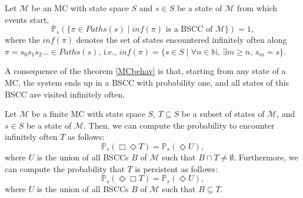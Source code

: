 \begin{theorem}\label{MCbehav}
Let $\mathcal{M}$ be an MC with state space $S$ and $s \in S$
be a state of $\mathcal{M}$ from which events start,
\[
  \mathbb{P}_s(\{\pi \in Paths(s) \; | \; inf(\pi) \text{ is a BSCC of }\mathcal{M}\}) = 1,
\]
where the $inf(\pi)$ denotes the set of states encountered infinitely often along $\pi = s_0 s_1 s_2 \dots \in Paths(s)$, i.e., $inf(\pi) = \{ s \in S \; | \; \forall n \in \mathbb{N},\, \exists m \geq n,\, s_m = s\}$.
\end{theorem}
A consequence of the theorem \ref{MCbehav} is that, starting from any state of a MC, the system ends up in a BSCC with probability one, and all states of this BSCC are visited infinitely often.

\begin{corollary}
  Let $\mathcal{M}$ be a finite MC with state space $S$, $T \subseteq S$ be a subset of states of $\mathcal{M}$, and $s \in S$ be a state of $\mathcal{M}$.
  Then, we can compute the probability to encounter infinitely often $T$ as follows:
  \[
    \mathbb{P}_s(\Box \Diamond T) = \mathbb{P}_s(\Diamond U),
  \]
  where $U$ is the union of all BSCCs $B$ of $\mathcal{M}$ such that $B \cap T \neq \emptyset$. Furthermore, we can compute the probability that $T$ is persistent as follows:
  \[
    \mathbb{P}_s(\Diamond \Box T) = \mathbb{P}_s(\Diamond U),
  \]
  where $U$ is the union of all BSCCs $B$ of $\mathcal{M}$ such that $B \subseteq T$.
\end{corollary}

